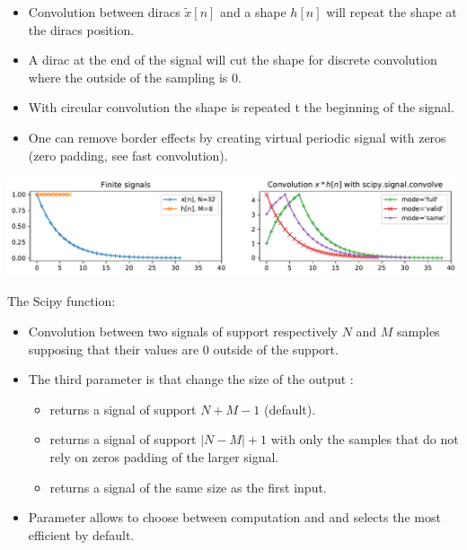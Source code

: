 \begin{itemize}
  \item Convolution between diracs $\tilde x[n]$ and a shape $h[n]$ will repeat the shape at the diracs position.
  \item A dirac at the end of the signal will cut the shape for discrete convolution where the outside of the sampling is $0$.
  \item With circular convolution the shape is repeated t the beginning of the signal.
  \item One can remove border effects by creating virtual periodic signal with zeros (zero padding, see fast convolution).
\end{itemize}



\begin{center}
  \includegraphics[width=1\linewidth]{imgs/sig_conv/conv_scipy_signal.pdf}
\end{center}\vspace{-2mm}

\begin{block}{The Scipy  function:}\vspace{-2mm}
  \begin{itemize} 
      \item Convolution between two signals of support respectively $N$ and $M$ samples supposing that their values are $0$ outside of the support.
      \item The third parameter is  that change the size of the output : \vspace{-1mm}
      \begin{itemize}
          \item {} returns a signal of support $N+M-1$ (default).
          \item {} returns a signal of support $|N-M|+1$ with only  the samples that do not rely on zeros padding of the larger signal.
          \item {} returns a signal of the same size as the first input.
      \end{itemize}
      \item Parameter  allows to choose between  computation and  and selects the most efficient by default.
  \end{itemize}
  

  
\end{block}\vspace{-2mm}


